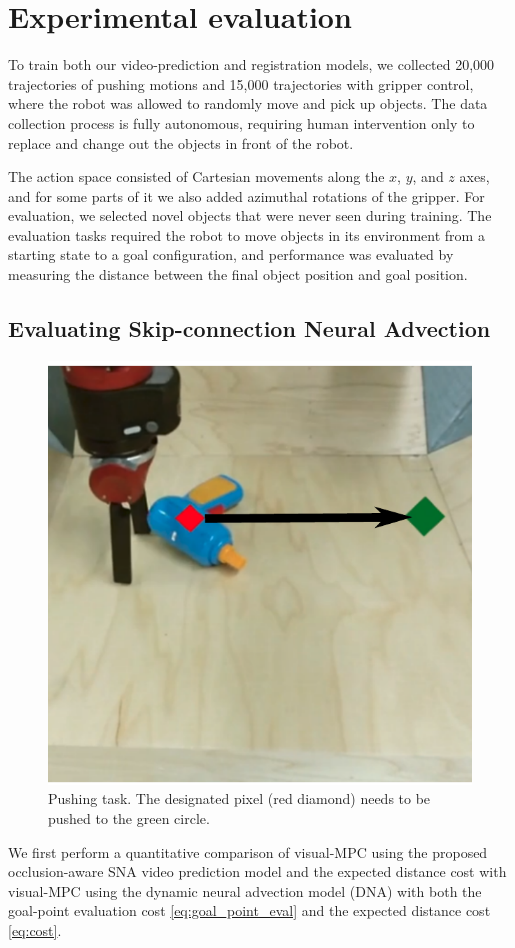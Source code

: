 \section{Experimental evaluation}
To train both our video-prediction and registration models, we collected 20,000 trajectories of pushing motions and 15,000 trajectories with gripper control, where the robot was allowed to randomly move and pick up objects. The data collection process is fully autonomous, requiring human intervention only to replace and change out the objects in front of the robot.

The action space consisted of Cartesian movements along the $x$, $y$, and $z$ axes, and for some parts of it we also added azimuthal rotations of the gripper. For evaluation, we selected novel objects that were never seen during training. The evaluation tasks required the robot to move objects in its environment from a starting state to a goal configuration, and performance was evaluated by measuring the distance between the final object position and goal position. 

\subsection{Evaluating Skip-connection Neural Advection}
\label{subsec:sna_experiments}
\begin{figure}
	\centering
	\includegraphics[width=0.30\columnwidth]{images_sna/longdistance_pushing/pushing.pdf}
	\caption{
		Pushing task. The designated pixel (red diamond) needs to be pushed to the green circle.
		\label{fig:long_distance_task}
	}
\end{figure}

We first perform a quantitative comparison of visual-MPC using the proposed occlusion-aware SNA video prediction model and the expected distance cost with visual-MPC using the dynamic neural advection model (DNA)\cite{foresight} with both the goal-point evaluation cost \ref{eq:goal_point_eval} and the expected distance cost \ref{eq:cost}.

